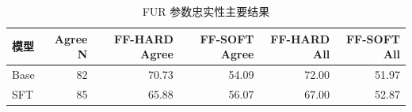 \begin{table}[H]
\centering
\small
\caption{FUR 参数忠实性主要结果}
\label{tab:faithfulness}
\begin{tabular}{lrrrrr}
\toprule
模型 & Agree N & FF-HARD Agree & FF-SOFT Agree & FF-HARD All & FF-SOFT All \\
\midrule
Base & 82 & 70.73 & 54.09 & 72.00 & 51.97 \\
SFT & 85 & 65.88 & 56.07 & 67.00 & 52.87 \\
\bottomrule
\end{tabular}
\end{table}
